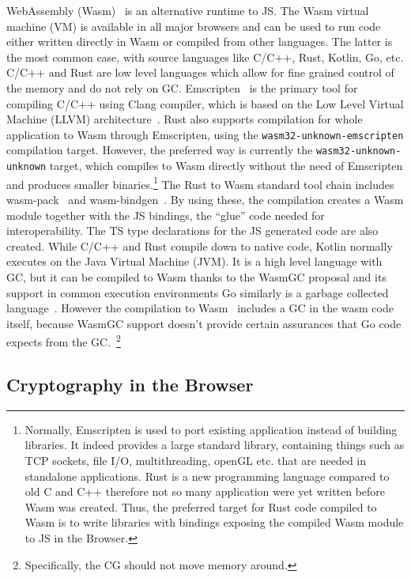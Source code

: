 WebAssembly (Wasm)~\cite{Haas2017,WasmSpecification} is an alternative runtime to JS.
The Wasm virtual machine (VM) is available in all major
browsers and can be used to run code either written directly in Wasm
or compiled from other languages. The latter is the
most common case, with source languages like C/C++, Rust,
Kotlin, Go, etc. C/C++ and Rust are low level languages
which allow for fine grained control of the memory
and do not rely on GC. Emscripten~\cite{Zakai2011} is the primary 
tool for compiling C/C++ using Clang compiler,
which is based on the Low Level Virtual Machine
(LLVM) architecture~\cite{LLVM2004}.
Rust also supports compilation for whole application to Wasm
through Emscripten, using the \texttt{wasm32-unknown-emscripten}
compilation target.
However, the preferred way is currently
the \texttt{wasm32-unknown-unknown} target, which
compiles to Wasm directly without the need of Emscripten
and produces smaller binaries.\footnote{Normally,
Emscripten is used to port existing application instead 
of building libraries. It indeed 
provides a large standard library, 
containing things such as TCP sockets, 
file I/O, multithreading, openGL etc. that are needed in
standalone applications.
Rust is a new programming language compared to
old C and C++ therefore not so many application were yet 
written before Wasm was created. 
Thus, the preferred target for Rust code compiled to Wasm
is to write libraries with bindings exposing the
compiled Wasm module to JS in the Browser.}
The Rust to Wasm standard tool chain includes 
wasm-pack~\cite{WasmPack} and wasm-bindgen~\cite{WasmBindgen}.
By using these, the compilation creates a Wasm 
module together with the JS bindings, the ``glue'' code
needed for interoperability. The TS type declarations 
for the JS generated code are also created.
While C/C++ and Rust compile down to native code, Kotlin normally executes on the
Java Virtual Machine (JVM). It is a high level language with GC,
but it can be compiled to Wasm thanks to the WasmGC proposal
and its support in common execution environments\cite{WasmGCProposal, WasmGCinV8}
Go similarly is a garbage collected language~\cite{GoGarbageCollector}.
However the compilation to Wasm~\cite{GOWasm} 
includes a GC in the wasm code itself, because WasmGC support doesn't
provide certain assurances that Go code expects from the GC.~\footnote{Specifically, the CG should not move memory around.}

\subsection{Cryptography in the Browser}\label{sc:webcrypto-api}

